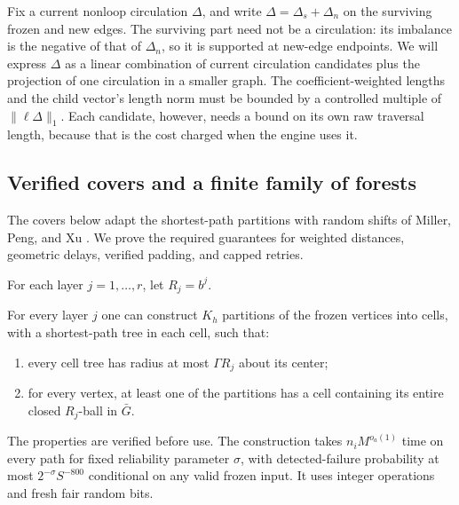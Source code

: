 Fix a current nonloop circulation $\Delta$, and write
$\Delta=\Delta_s+\Delta_n$ on the surviving frozen and new edges.
The surviving part need not be a circulation: its imbalance is the
negative of that of $\Delta_n$, so it is supported at new-edge endpoints.
We will express $\Delta$ as a linear combination of current circulation
candidates plus the projection of one circulation in a smaller graph.
The coefficient-weighted lengths and the child vector's length norm must
be bounded by a controlled multiple of $\|\ell\Delta\|_1$.
Each candidate, however, needs a bound on its own raw traversal length,
because that is the cost charged when the engine uses it.

\subsection{Verified covers and a finite family of forests}

The covers below adapt the shortest-path partitions with random shifts
of Miller, Peng, and Xu
\cite[Algorithm~2 and Lemmas~4.1 and~4.4]{RandomShifts}.
We prove the required guarantees for weighted distances, geometric
delays, verified padding, and capped retries.

For each layer $j=1,\ldots,r$, let $R_j=b^j$.

\begin{lemma}
\label{back:covers}
For every layer $j$ one can construct $K_h$ partitions of the frozen
vertices into cells, with a shortest-path tree in each cell, such that:
\begin{enumerate}[label=(\roman*)]
\item every cell tree has radius at most $\Gamma R_j$ about its center;
\item for every vertex, at least one of the partitions has a cell
containing its entire closed $R_j$-ball in $\bar G$.
\end{enumerate}
The properties are verified before use.  The construction takes
$n_iM^{o_a(1)}$ time on every path for fixed reliability parameter
$\sigma$, with detected-failure probability at most
$2^{-\sigma}S^{-800}$ conditional on any valid frozen input.  It uses
integer operations and fresh fair random bits.
\end{lemma}

